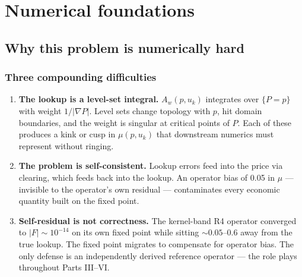 \part{Numerical foundations}

\chapter{Why this problem is numerically hard}

\section{Three compounding difficulties}
\begin{enumerate}\itemsep2pt
  \item \textbf{The lookup is a level-set integral.} $A_w(p, u_k)$
        integrates over $\{P = p\}$ with weight $1/|\nabla P|$. Level
        sets change topology with $p$, hit domain boundaries, and the
        weight is singular at critical points of $P$. Each of these
        produces a kink or cusp in $\mu(p, u_k)$ that downstream
        numerics must represent without ringing.
  \item \textbf{The problem is self-consistent.} Lookup errors feed
        into the price via clearing, which feeds back into the lookup.
        An operator bias of 0.05 in $\mu$ --- invisible to the
        operator's own residual --- contaminates every economic
        quantity built on the fixed point.
  \item \textbf{Self-residual is not correctness.} The kernel-band R4
        operator converged to $|F| \sim 10^{-14}$ on its own fixed
        point while sitting $\sim 0.05$--$0.6$ away from the true
        lookup. The fixed point migrates to compensate for operator
        bias. The only defense is an independently derived reference
        operator --- the role \strict{} plays throughout Parts III--VI.
\end{enumerate}

